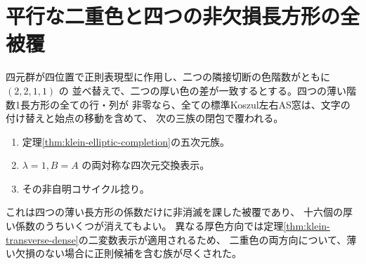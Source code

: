 \section{平行な二重色と四つの非欠損長方形の全被覆}
\label{sec:full-thin-parallel-cover}
\begin{theorem}\label{thm:full-thin-parallel-cover}
四元群が四位置で正則表現型に作用し、二つの隣接切断の色階数がともに $(2,2,1,1)$ の
並べ替えで、二つの厚い色の差が一致するとする。四つの薄い階数1長方形の全ての行・列が
非零なら、全ての標準Koszul左右AS窓は、文字の付け替えと始点の移動を含めて、
次の三族の閉包で覆われる。
\begin{enumerate}
\item 定理\ref{thm:klein-elliptic-completion}の五次元族。
\item $\lambda=1,B=A$ の両対称な四次元交換表示。
\item その非自明コサイクル捻り。
\end{enumerate}
これは四つの薄い長方形の係数だけに非消滅を課した被覆であり、
十六個の厚い係数のうちいくつが消えてもよい。
異なる厚色方向では定理\ref{thm:klein-transverse-dense}の二変数表示が適用されるため、
二重色の両方向について、薄い欠損のない場合に正則候補を含む族が尽くされた。
\end{theorem}
